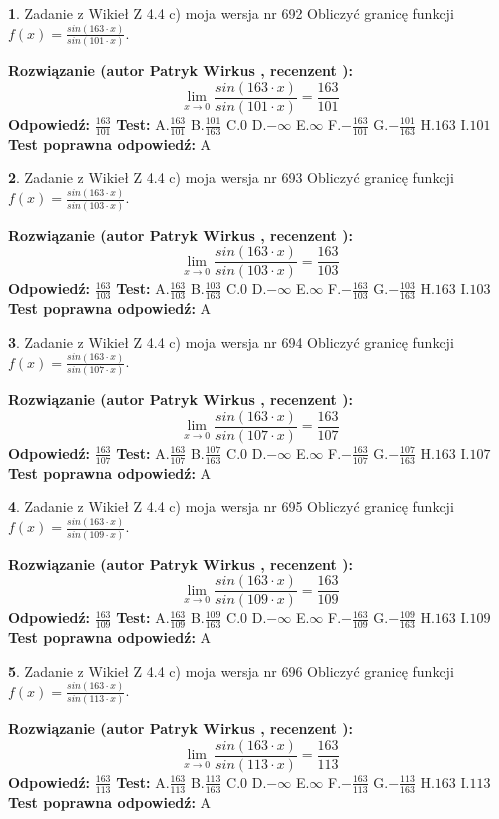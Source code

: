 \documentclass[12pt, a4paper]{article}
\theoremstyle{definition} %
\newtheorem{zad}{}
\newcommand{\zadStart}[1]{\begin{zad}#1\newline}
\newcommand{\zadStop}{\end{zad}}
\newcommand{\rozwStart}[2]{\noindent \textbf{Rozwiązanie (autor #1 , recenzent #2): }\newline}
\newcommand{\rozwStop}{\newline}
\newcommand{\odpStart}{\noindent \textbf{Odpowiedź:}\newline}
\newcommand{\odpStop}{\newline}
\newcommand{\testStart}{\noindent \textbf{Test:}\newline}
\newcommand{\testStop}{\newline}
\newcommand{\kluczStart}{\noindent \textbf{Test poprawna odpowiedź:}\newline}
\newcommand{\kluczStop}{\newline}
\begin{document}
\zadStart{Zadanie z Wikieł Z 4.4 c) moja wersja nr 692}
Obliczyć granicę funkcji $f(x)=\frac{sin(163\cdot x)}{sin(101\cdot x)}$.
\zadStop
\rozwStart{Patryk Wirkus}{}
$$\lim\limits_{x\to 0}\frac{sin(163\cdot x)}{sin(101\cdot x)}=
\frac{163}{101}$$
\rozwStop
\odpStart
$\frac{163}{101}$
\odpStop
\testStart
A.$\frac{163}{101}$
B.$\frac{101}{163}$
C.$0$
D.$-\infty$
E.$\infty$
F.$-\frac{163}{101}$
G.$-\frac{101}{163}$
H.$163$
I.$101$
\testStop
\kluczStart
A
\kluczStop



\zadStart{Zadanie z Wikieł Z 4.4 c) moja wersja nr 693}
Obliczyć granicę funkcji $f(x)=\frac{sin(163\cdot x)}{sin(103\cdot x)}$.
\zadStop
\rozwStart{Patryk Wirkus}{}
$$\lim\limits_{x\to 0}\frac{sin(163\cdot x)}{sin(103\cdot x)}=
\frac{163}{103}$$
\rozwStop
\odpStart
$\frac{163}{103}$
\odpStop
\testStart
A.$\frac{163}{103}$
B.$\frac{103}{163}$
C.$0$
D.$-\infty$
E.$\infty$
F.$-\frac{163}{103}$
G.$-\frac{103}{163}$
H.$163$
I.$103$
\testStop
\kluczStart
A
\kluczStop



\zadStart{Zadanie z Wikieł Z 4.4 c) moja wersja nr 694}
Obliczyć granicę funkcji $f(x)=\frac{sin(163\cdot x)}{sin(107\cdot x)}$.
\zadStop
\rozwStart{Patryk Wirkus}{}
$$\lim\limits_{x\to 0}\frac{sin(163\cdot x)}{sin(107\cdot x)}=
\frac{163}{107}$$
\rozwStop
\odpStart
$\frac{163}{107}$
\odpStop
\testStart
A.$\frac{163}{107}$
B.$\frac{107}{163}$
C.$0$
D.$-\infty$
E.$\infty$
F.$-\frac{163}{107}$
G.$-\frac{107}{163}$
H.$163$
I.$107$
\testStop
\kluczStart
A
\kluczStop



\zadStart{Zadanie z Wikieł Z 4.4 c) moja wersja nr 695}
Obliczyć granicę funkcji $f(x)=\frac{sin(163\cdot x)}{sin(109\cdot x)}$.
\zadStop
\rozwStart{Patryk Wirkus}{}
$$\lim\limits_{x\to 0}\frac{sin(163\cdot x)}{sin(109\cdot x)}=
\frac{163}{109}$$
\rozwStop
\odpStart
$\frac{163}{109}$
\odpStop
\testStart
A.$\frac{163}{109}$
B.$\frac{109}{163}$
C.$0$
D.$-\infty$
E.$\infty$
F.$-\frac{163}{109}$
G.$-\frac{109}{163}$
H.$163$
I.$109$
\testStop
\kluczStart
A
\kluczStop



\zadStart{Zadanie z Wikieł Z 4.4 c) moja wersja nr 696}
Obliczyć granicę funkcji $f(x)=\frac{sin(163\cdot x)}{sin(113\cdot x)}$.
\zadStop
\rozwStart{Patryk Wirkus}{}
$$\lim\limits_{x\to 0}\frac{sin(163\cdot x)}{sin(113\cdot x)}=
\frac{163}{113}$$
\rozwStop
\odpStart
$\frac{163}{113}$
\odpStop
\testStart
A.$\frac{163}{113}$
B.$\frac{113}{163}$
C.$0$
D.$-\infty$
E.$\infty$
F.$-\frac{163}{113}$
G.$-\frac{113}{163}$
H.$163$
I.$113$
\testStop
\kluczStart
A
\kluczStop
\end{document}
